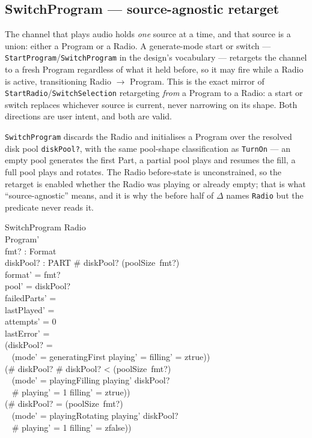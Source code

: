 \documentclass[a4paper,10pt,fleqn]{article}
\begin{document}
\subsection{SwitchProgram --- source-agnostic retarget}

The channel that plays audio holds \emph{one} source at a time, and that source
is a union: either a Program or a Radio. A generate-mode start or switch ---
\texttt{StartProgram}/\texttt{SwitchProgram} in the design's vocabulary ---
retargets the channel to a fresh Program regardless of what it held before, so
it may fire while a Radio is active, transitioning Radio $\to$ Program. This is
the exact mirror of \texttt{StartRadio}/\texttt{SwitchSelection} retargeting
\emph{from} a Program to a Radio: a start or switch replaces whichever source is
current, never narrowing on its shape. Both directions are user intent, and both
are valid.

\texttt{SwitchProgram} discards the Radio and initialises a Program over the
resolved disk pool \texttt{diskPool?}, with the same pool-shape classification as
\texttt{TurnOn} --- an empty pool generates the first Part, a partial pool plays
and resumes the fill, a full pool plays and rotates. The Radio before-state is
unconstrained, so the retarget is enabled whether the Radio was playing or
already empty; that is what ``source-agnostic'' means, and it is why the before
half of $\Delta$ names \texttt{Radio} but the predicate never reads it.

\begin{schema}{SwitchProgram}
  Radio \\
  Program' \\
  fmt? : Format \\
  diskPool? : \power PART
  \where
  \# diskPool? \leq (poolSize~fmt?) \\
  format' = fmt? \\
  pool' = diskPool? \\
  failedParts' = \emptyset \\
  lastPlayed' = \emptyset \\
  attempts' = 0 \\
  lastError' = \emptyset \\
  (diskPool? = \emptyset \implies \\
    \quad~ (mode' = generatingFirst \land playing' = \emptyset \land filling' = ztrue)) \\
  (\# diskPool?  \land \# diskPool? < (poolSize~fmt?) \implies \\
    \quad~ (mode' = playingFilling \land playing' \subseteq diskPool? \\
    \quad~ \land \# playing' = 1 \land filling' = ztrue)) \\
  (\# diskPool? = (poolSize~fmt?) \implies \\
    \quad~ (mode' = playingRotating \land playing' \subseteq diskPool? \\
    \quad~ \land \# playing' = 1 \land filling' = zfalse))
\end{schema}
\end{document}
